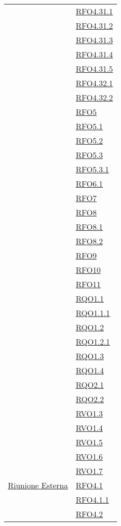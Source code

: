\begin{longtable}{|>{\centering}m{5cm}|m{5cm}<{\centering}|}
& \hyperlink{RFO4.31.1}{RFO4.31.1}\\
& \hyperlink{RFO4.31.2}{RFO4.31.2}\\
& \hyperlink{RFO4.31.3}{RFO4.31.3}\\
& \hyperlink{RFO4.31.4}{RFO4.31.4}\\
& \hyperlink{RFO4.31.5}{RFO4.31.5}\\
& \hyperlink{RFO4.32.1}{RFO4.32.1}\\
& \hyperlink{RFO4.32.2}{RFO4.32.2}\\
& \hyperlink{RFO5}{RFO5}\\
& \hyperlink{RFO5.1}{RFO5.1}\\
& \hyperlink{RFO5.2}{RFO5.2}\\
& \hyperlink{RFO5.3}{RFO5.3}\\
& \hyperlink{RFO5.3.1}{RFO5.3.1}\\
& \hyperlink{RFO6.1}{RFO6.1}\\
& \hyperlink{RFO7}{RFO7}\\
& \hyperlink{RFO8}{RFO8}\\
& \hyperlink{RFO8.1}{RFO8.1}\\
& \hyperlink{RFO8.2}{RFO8.2}\\
& \hyperlink{RFO9}{RFO9}\\
& \hyperlink{RFO10}{RFO10}\\
& \hyperlink{RFO11}{RFO11}\\
& \hyperlink{RQO1.1}{RQO1.1}\\
& \hyperlink{RQO1.1.1}{RQO1.1.1}\\
& \hyperlink{RQO1.2}{RQO1.2}\\
& \hyperlink{RQO1.2.1}{RQO1.2.1}\\
& \hyperlink{RQO1.3}{RQO1.3}\\
& \hyperlink{RQO1.4}{RQO1.4}\\
& \hyperlink{RQO2.1}{RQO2.1}\\
& \hyperlink{RQO2.2}{RQO2.2}\\
& \hyperlink{RVO1.3}{RVO1.3}\\
& \hyperlink{RVO1.4}{RVO1.4}\\
& \hyperlink{RVO1.5}{RVO1.5}\\
& \hyperlink{RVO1.6}{RVO1.6}\\
& \hyperlink{RVO1.7}{RVO1.7}\\ \hline
\hyperlink{Riunione Esterna}{Riunione Esterna} & \hyperlink{RFO4.1}{RFO4.1}\\
& \hyperlink{RFO4.1.1}{RFO4.1.1}\\
& \hyperlink{RFO4.2}{RFO4.2}\\

\end{longtable}
